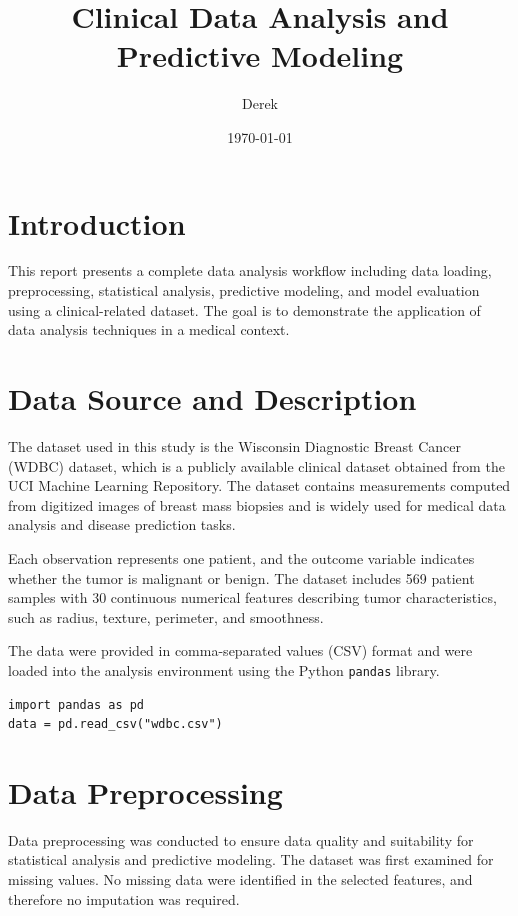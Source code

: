 \documentclass[12pt]{article}
\title{Clinical Data Analysis and Predictive Modeling}
\author{Derek}
\date{\today}
\begin{document}
\maketitle

\section{Introduction}
This report presents a complete data analysis workflow including data loading, preprocessing,
statistical analysis, predictive modeling, and model evaluation using a clinical-related dataset.
The goal is to demonstrate the application of data analysis techniques in a medical context.

\section{Data Source and Description}

The dataset used in this study is the Wisconsin Diagnostic Breast Cancer (WDBC) dataset,
which is a publicly available clinical dataset obtained from the UCI Machine Learning Repository.
The dataset contains measurements computed from digitized images of breast mass biopsies
and is widely used for medical data analysis and disease prediction tasks.

Each observation represents one patient, and the outcome variable indicates whether the tumor
is malignant or benign. The dataset includes 569 patient samples with 30 continuous numerical
features describing tumor characteristics, such as radius, texture, perimeter, and smoothness.

The data were provided in comma-separated values (CSV) format and were loaded into the analysis
environment using the Python \texttt{pandas} library.

\begin{verbatim}
import pandas as pd
data = pd.read_csv("wdbc.csv")
\end{verbatim}

\section{Data Preprocessing}

Data preprocessing was conducted to ensure data quality and suitability for statistical
analysis and predictive modeling. The dataset was first examined for missing values.
No missing data were identified in the selected features, and therefore no imputation
was required.
\end{document}
